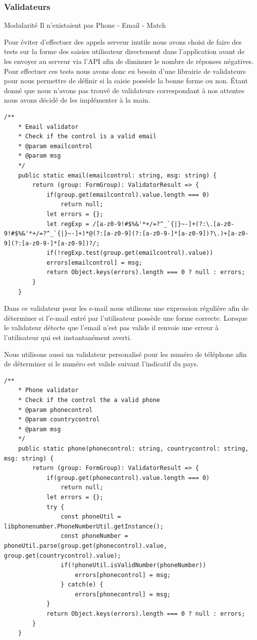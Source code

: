 \documentclass[french]{article}
\begin{document}
	\subsubsection{Validateurs}
	
	Modularité
	Il n'existaient pas 
	Phone - Email - Match
	
	Pour éviter d'effectuer des appels serveur inutile nous avons choisi de faire des tests sur la forme des saisies utilisateur directement dans l'application avant de les envoyer au serveur via l'API afin de diminuer le nombre de réponses négatives. Pour effectuer ces tests nous avons donc eu besoin d'une librairie de validateurs pour nous permettre de définir si la saisie possède la bonne forme ou non. 
	Étant donné que nous n'avons pas trouvé de validateurs correspondant à nos attentes nous avons décidé de les implémenter à la main.
	
	\begin{lstlisting}[style=htmlcssjs]
	/**
	* Email validator
	* Check if the control is a valid email
	* @param emailcontrol
	* @param msg
	*/
	public static email(emailcontrol: string, msg: string) {
		return (group: FormGroup): ValidatorResult => {
			if(group.get(emailcontrol).value.length === 0)
				return null;
			let errors = {};
			let regExp = /[a-z0-9!#$%&'*+/=?^_`{|}~-]+(?:\.[a-z0-9!#$%&'*+/=?^_`{|}~-]+)*@(?:[a-z0-9](?:[a-z0-9-]*[a-z0-9])?\.)+[a-z0-9](?:[a-z0-9-]*[a-z0-9])?/;
			if(!regExp.test(group.get(emailcontrol).value))
			errors[emailcontrol] = msg;
			return Object.keys(errors).length === 0 ? null : errors;
		}
	}
	\end{lstlisting}
	
	Dans ce validateur pour les e-mail nous utilisons une expression régulière afin de déterminer si l'e-mail entré par l'utilisateur possède une forme correcte. Lorsque le validateur détecte que l'email n'est pas valide il renvoie une erreur à l'utilisateur qui est instantanément averti.
	
	Nous utilisons aussi un validateur personalisé pour les numéro de téléphone afin de déterminer si le numéro est valide suivant l'indicatif du pays. 
	\begin{lstlisting}[style=htmlcssjs]
	/**
	* Phone validator
	* Check if the control the a valid phone
	* @param phonecontrol
	* @param countrycontrol
	* @param msg
	*/
	public static phone(phonecontrol: string, countrycontrol: string, msg: string) {
		return (group: FormGroup): ValidatorResult => {
			if(group.get(phonecontrol).value.length === 0)
				return null;
			let errors = {};
			try {
				const phoneUtil = libphonenumber.PhoneNumberUtil.getInstance();
				const phoneNumber = phoneUtil.parse(group.get(phonecontrol).value, group.get(countrycontrol).value);
				if(!phoneUtil.isValidNumber(phoneNumber))
					errors[phonecontrol] = msg;
				} catch(e) {
					errors[phonecontrol] = msg;
			}
			return Object.keys(errors).length === 0 ? null : errors;
		}
	}
	\end{lstlisting}
	
\end{document}
